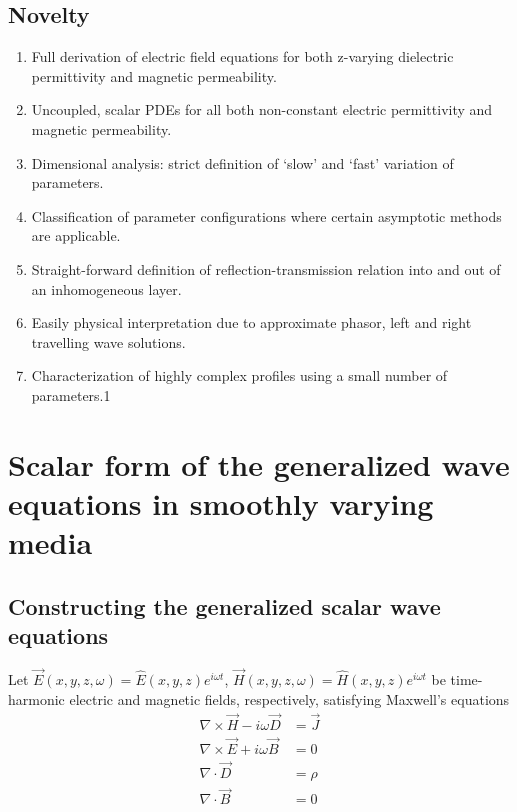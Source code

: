 \documentclass[twocolumn,secnumarabic,amssymb, nobibnotes, aps, prd]{revtex4-1}
\begin{document}
\subsection{Novelty}
\begin{enumerate}
\item Full derivation of electric field equations for both z-varying dielectric permittivity and magnetic permeability.  
\item Uncoupled, scalar PDEs for all both non-constant electric permittivity and magnetic permeability.
\item Dimensional analysis: strict definition of `slow' and `fast' variation of parameters.
\item Classification of parameter configurations where certain asymptotic methods are applicable.
\item Straight-forward definition of reflection-transmission relation into and out of an inhomogeneous layer.
\item Easily physical interpretation due to approximate phasor, left and right travelling wave solutions.
\item Characterization of highly complex profiles using a small number of parameters.1

\end{enumerate}





\section{Scalar form of the generalized wave equations in smoothly varying media}
\subsection{Constructing the generalized scalar wave equations}

Let $\overrightarrow{E}(x,y,z,\omega) = \hat{E}(x,y,z)e^{i \omega t}$, $\overrightarrow{H}(x,y,z,\omega) = \hat{H}(x,y,z)e^{i \omega t}$ be time-harmonic electric and magnetic fields, respectively, satisfying Maxwell's equations
\begin{subequations}

	\begin{align}
        \nabla \times \overrightarrow{H}-i \omega \overrightarrow{D} &= \overrightarrow{J}  \label{eqns:CurlH_Maxwell}	\\	
        \nabla \times \overrightarrow{E} + i \omega \overrightarrow{B} &= 0  \label{eqns:CurlE_Maxwell} \\
		\nabla \cdot \overrightarrow{D} &=  \rho	 \label{eqns:DivD_Maxwell}\\		
		\nabla \cdot \overrightarrow{B} &= 0	
	\end{align}
\end{subequations}
 
\end{document}

